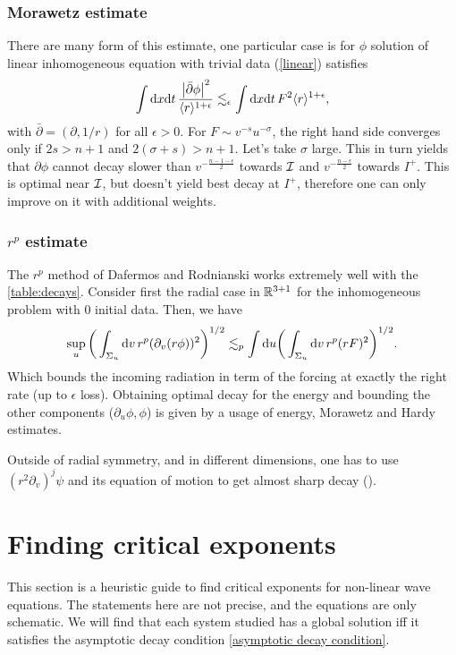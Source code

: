 \documentclass[11pt, oneside]{amsart}
\begin{document}
	\subsubsection{Morawetz estimate}
	There are many form of this estimate, one particular case is for $\phi$ solution of linear inhomogeneous equation with trivial data (\eqref{linear})  satisfies
	\begin{equation*}
		\begin{gathered}
			\int\mathrm{d} x\mathrm{d} t\, \frac{\left\lvert \bar{\partial}\phi\right\rvert^2}{\langle r \rangle^{1+\epsilon}}\lesssim_\epsilon\int\mathrm{d} x\mathrm{d} t\, F^2\langle r \rangle^{1+\epsilon},
		\end{gathered}
	\end{equation*}
	with $\bar{\partial}=(\partial,1/r)$ for all $\epsilon>0$. For $F\sim v^{-s}u^{-\sigma}$, the right hand side converges only if $2s>n+1$ and $2(\sigma+s)>n+1$. Let's take $\sigma$ large. This in turn yields that $\partial\phi$ cannot decay slower than $v^{-\frac{n-1-\epsilon}{2}}$ towards $\mathcal{I}$ and $v^{-\frac{n-\epsilon}{2}}$ towards $I^+$. This is optimal near $\mathcal{I}$,  but doesn't yield best decay at $I^+$, therefore one can only improve on it with additional weights.
	
	\subsubsection{$r^p$ estimate}
		The $r^p$ method of Dafermos and Rodnianski \cite{dafermos_new_2010} works extremely well with the \cref{table:decays}. Consider first the radial case in $\mathbb{R}^{3+1}$ for the inhomogeneous problem with 0 initial data. Then, we have
		\begin{equation*}
			\begin{gathered}
				\sup_u\bigg(\int_{\Sigma_u} \mathrm{d} v\, r^p(\partial_v(r\phi))^2\bigg)^{1/2}\lesssim_p\int\mathrm{d} u \bigg(\int_{\Sigma_u}\mathrm{d} v\, r^p(rF)^2\bigg)^{1/2}.
			\end{gathered}
		\end{equation*}
		Which bounds the incoming radiation in term of the forcing at exactly the right rate (up to $\epsilon$ loss). Obtaining optimal decay for the energy and bounding the other components ($\partial_u\phi,\phi$) is given by a usage of energy, Morawetz and Hardy estimates.
		
		Outside of radial symmetry, and in different dimensions, one has to use $(r^2\partial_v)^j\psi$ and its equation of motion to get almost sharp decay (\cite{angelopoulos_late-time_2018}).

	\section{Finding critical exponents}\label{finding critical exponents}
	This section is a heuristic guide to find critical exponents for non-linear wave equations. The statements here are not precise, and the equations are only schematic. We will find that each system studied has a global solution iff it satisfies the asymptotic decay condition \cref{asymptotic decay condition}.
	
\end{document}
